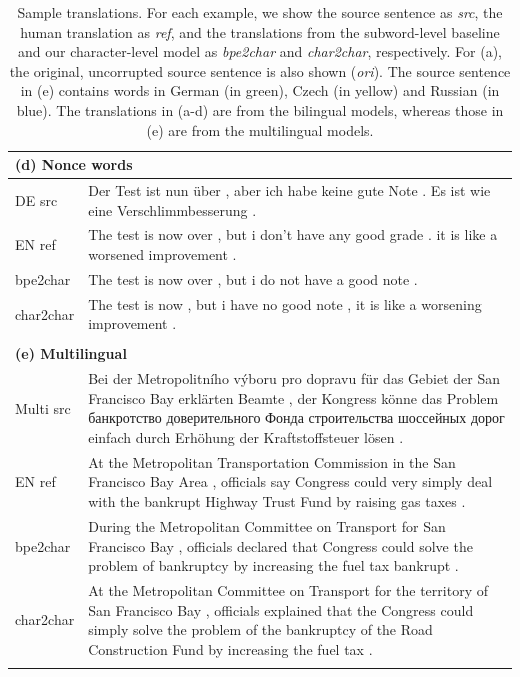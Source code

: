 \documentclass[11pt,letterpaper]{article}
\newcommand{\ti}{\textit}
\newcommand{\tb}{\textbf}
\newcommand{\clr}{\color{Red}}
\newcommand{\clg}{\color{ForestGreen}}
\newcommand{\cly}{\color{YellowOrange}}
\newcommand{\clb}{\color{Cerulean}}
\begin{document}
\begin{table}[h!]
\begin{tabular}{p{1.4cm}|p{14.2cm}}
    \multicolumn{2}{l}{\tb{(d) Nonce words}} \\ \hline \hline
    DE src  & Der Test ist nun \"uber , aber ich habe keine gute Note . Es ist wie eine {\clr Verschlimmbesserung} . \\ \hline
    EN ref  & The test is now over , but i don't have any good grade . it is like a {\clr worsened improvement} . \\ \hline
    bpe2char &  The test is now over , but i do not have a good note . \\ \hline
    char2char & The test is now , but i have no good note , it is like a {\clr worsening improvement} . \\ \hline
    \multicolumn{2}{l}{}       \\

    \multicolumn{2}{l}{\tb{(e) Multilingual}} \\ \hline \hline
    Multi src  & \vspace{-0.85em} {\clg\foreignlanguage{german}{ Bei der}} {\cly \foreignlanguage{czech}{Metropolitního výboru pro dopravu}} {\clg\foreignlanguage{german}{für das Gebiet der San Francisco Bay erklärten Beamte , der Kongress könne das Problem}} {\clb\foreignlanguage{russian}{банкротство доверительного Фонда строительства шоссейных дорог}} {\clg\foreignlanguage{german}{einfach durch Erhöhung der Kraftstoffsteuer lösen }} .\\ \hline
    EN ref  & At the Metropolitan Transportation Commission in the San Francisco Bay Area , officials say Congress could very simply {\clr deal with the bankrupt Highway Trust Fund }by raising gas taxes . \\ \hline
    bpe2char & During the Metropolitan Committee on Transport for San Francisco Bay , officials declared that Congress could {\clr solve the problem of bankruptcy} by increasing the fuel tax bankrupt . \\ \hline
    char2char & At the Metropolitan Committee on Transport for the territory of San Francisco Bay , officials explained that the Congress could simply {\clr solve the problem of the bankruptcy of the Road Construction Fund }by increasing the fuel tax . \\ \hline
    \multicolumn{2}{l}{}       \\


    \end{tabular}
    \vspace{-8mm}
    \caption{Sample translations. For each example, we show the source sentence as \ti{src}, the human translation as \ti{ref}, and the translations from the subword-level baseline and our character-level model as \ti{bpe2char} and \ti{char2char}, respectively. For (a), the original, uncorrupted source sentence is also shown (\ti{ori}). The source sentence in (e) contains words in German (in green), Czech (in yellow) and Russian (in blue). The translations in (a-d) are from the bilingual models, whereas those in (e) are from the multilingual models.}
    \label{table:qual}
    \normalsize
    \end{table}
\end{document}
